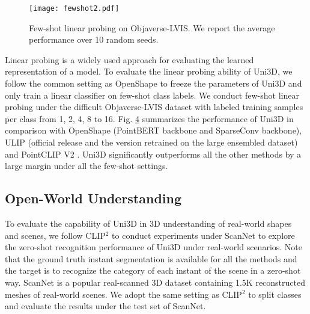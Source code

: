 \documentclass{article} \usepackage{iclr2024_conference,times}
\def\Ours{Uni3D\xspace}
\begin{document}
\begin{wrapfigure}{r}{0.4\linewidth}
\label{fig:fewshot}
  \vspace{-0.7cm}

  \texttt{[image: fewshot2.pdf]}
  \vspace{-0.9cm}
  
  \caption{Few-shot linear probing on Objaverse-LVIS. We report the average performance over 10 random seeds.}
  \vspace{-0.5cm}
\end{wrapfigure}

Linear probing is a widely used approach for evaluating the learned representation of a model. To evaluate the linear probing ability of \Ours, we follow the common setting as OpenShape \citep{liu2023openshape} to freeze the parameters of \Ours and only train a linear classifier on few-shot class labels. We conduct few-shot linear probing under the difficult Objaverse-LVIS dataset with labeled training samples per class from 1, 2, 4, 8 to 16. Fig. \hyperref[fig:fewshot]{4} summarizes the performance of \Ours in comparison with OpenShape \citep{liu2023openshape} (PointBERT backbone and SparseConv backbone), ULIP \citep{xue2023ulip} (official release and the version retrained on the large ensembled dataset) and PointCLIP V2 \citep{zhu2022pointclipv2}. \Ours significantly outperforms all the other methods by a large margin under all the few-shot settings.

\subsection{Open-World Understanding}

To evaluate the capability of \Ours in 3D understanding of real-world shapes and scenes, we follow CLIP$^2$ \citep{zeng2023clip2} to conduct experiments under ScanNet \citep{dai2017scannet} to explore the zero-shot recognition performance of \Ours under real-world scenarios. Note that the ground truth instant segmentation is available for all the methods and the target is to recognize the category of each instant of the scene in a zero-shot way. ScanNet \citep{dai2017scannet} is a popular real-scanned 3D dataset containing 1.5K reconstructed meshes of real-world scenes. We adopt the same setting as CLIP$^2$ to split classes and evaluate the results under the test set of ScanNet. 
\end{document}
